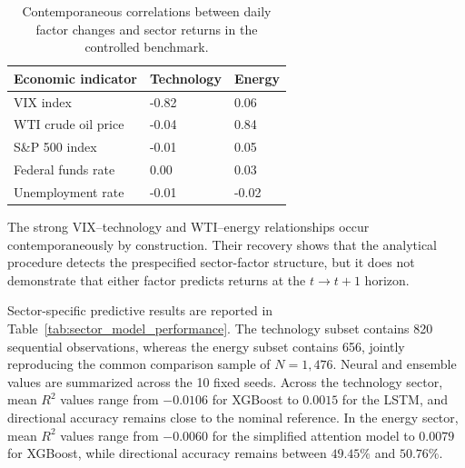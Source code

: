 \documentclass[utf8]{FrontiersinHarvard} %
\newcommand{\rev}[1]{{\color{red}#1}}
\begin{document}
\begin{table}[h]
	\caption{Contemporaneous correlations between daily factor changes and sector returns in the controlled benchmark.}
	\label{tab:sector_factor_correlations}
	\setlength{\tabcolsep}{3pt}
	\centering
	\begin{tabular}{p{165pt}p{85pt}p{85pt}}
		\hline
		\textbf{Economic indicator} &
		\textbf{Technology} &
		\textbf{Energy} \\
		\hline
		
		VIX index &
		-0.82 &
		0.06 \\
		
		WTI crude oil price &
		-0.04 &
		0.84 \\
		
		S\&P 500 index &
		-0.01 &
		0.05 \\
		
		Federal funds rate &
		0.00 &
		0.03 \\
		
		Unemployment rate &
		-0.01 &
		-0.02 \\
		\hline
		
	\end{tabular}
	\footnotesize
\end{table}

\rev{The strong VIX--technology and WTI--energy relationships occur contemporaneously by construction. Their recovery shows that the analytical procedure detects the prespecified sector-factor structure, but it does not demonstrate that either factor predicts returns at the \(t\rightarrow t+1\) horizon.}

Sector-specific predictive results are reported in Table~\ref{tab:sector_model_performance}. The technology subset contains 820 sequential observations, whereas the energy subset contains 656, jointly reproducing the common comparison sample of \(N=1{,}476\). Neural and ensemble values are summarized across the 10 fixed seeds. Across the technology sector, mean \(R^2\) values range from \(-0.0106\) for XGBoost to \(0.0015\) for the LSTM, and directional accuracy remains close to the nominal reference. In the energy sector, mean \(R^2\) values range from \(-0.0060\) for the simplified attention model to \(0.0079\) for XGBoost, while directional accuracy remains between \(49.45\%\) and \(50.76\%\).
\end{document}
